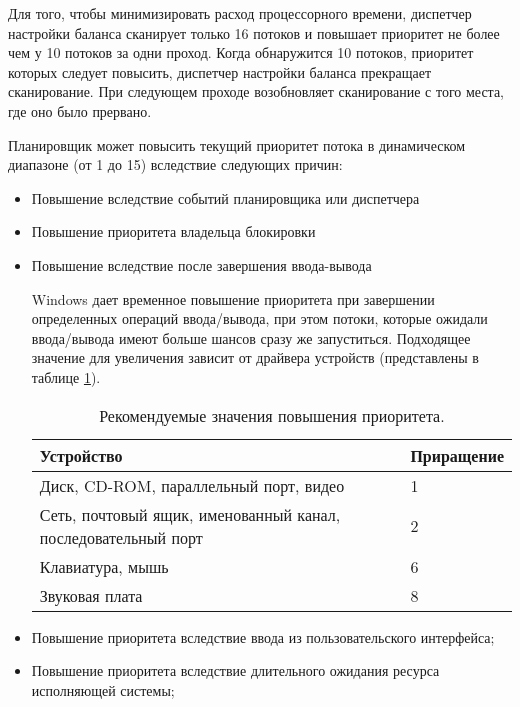 Для того, чтобы минимизировать расход процессорного времени, диспетчер настройки баланса сканирует только 16 потоков и повышает приоритет не более чем у 10 потоков за одни проход. Когда обнаружится 10 потоков, приоритет которых следует повысить, диспетчер настройки баланса прекращает сканирование. При следующем проходе возобновляет сканирование с того места, где оно было прервано.

Планировщик может повысить текущий приоритет потока в динамическом диапазоне (от 1 до 15) вследствие следующих причин:

\begin{itemize}
	\item Повышение вследствие событий планировщика или диспетчера
	
	\item Повышение приоритета владельца блокировки
	
	\item Повышение вследствие после завершения ввода-вывода

	Windows дает временное повышение приоритета при завершении определенных операций ввода/вывода, при этом потоки, которые ожидали ввода/вывода имеют больше шансов сразу же запуститься. Подходящее значение для увеличения зависит от драйвера устройств (представлены в таблице \ref{tab:io}).

	\begin{table}[h!]
	\caption{Рекомендуемые значения повышения приоритета.}
	\begin{center}
		\begin{tabular}{|p{100mm}|l|}
			\hline
			\textbf{Устройство} & \textbf{Приращение} \\
			\hline
			Диск, CD-ROM, параллельный порт, видео & 1 \\
			\hline
			Сеть, почтовый ящик, именованный канал, последовательный порт & 2 \\
			\hline
			Клавиатура, мышь & 6 \\
			\hline
			Звуковая плата & 8 \\
			\hline
		\end{tabular}
	\end{center}
	\label{tab:io}
	\end{table}
	
	\item Повышение приоритета вследствие ввода из пользовательского интерфейса;

	\item Повышение приоритета вследствие длительного ожидания ресурса исполняющей системы;
	

\end{itemize}
